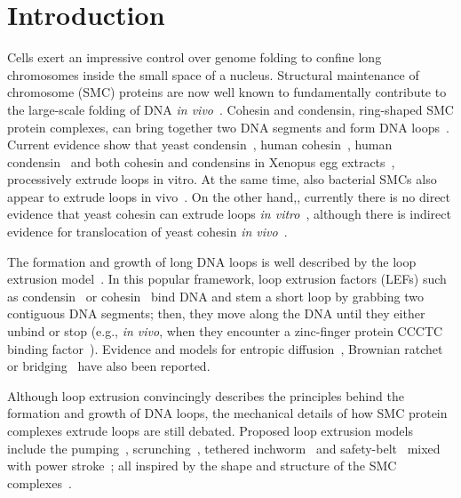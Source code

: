 \documentclass[aps,prl,twocolumn,a4paper,10pt,notitlepage,footinbib,nobalancelastpage,superscriptaddress,showpacs,floatfix]{revtex4-1}%
\begin{document}
\section{Introduction}

Cells exert an impressive control over genome folding to confine long chromosomes inside the small space of a nucleus. Structural maintenance of chromosome (SMC) proteins are now well known to fundamentally contribute to the large-scale folding of DNA \emph{in vivo}~\cite{Hirano2002}. Cohesin and condensin, ring-shaped SMC protein complexes, can bring together two DNA segments and form DNA loops~\cite{Nasmyth2011,Uhlmann2016,Hirano2016}. Current evidence show that yeast condensin~\cite{Ganji2018}, human cohesin~\cite{Davidson2019a,Kim2019a}, human condensin~\cite{Kong2020} and both cohesin and condensins in Xenopus egg extracts~\cite{Golfier2020}, processively extrude loops in vitro. 
At the same time, also bacterial SMCs also appear to extrude loops in vivo~\cite{Brandao2019a,Brandao2021,Anchimiuk2021}. On the other hand,, currently there is no direct evidence that yeast cohesin can extrude loops \emph{in vitro}~\cite{Stigler2016,Gutierrez-Escribano2019,Ryu2021}, although there is indirect evidence for translocation of yeast cohesin \emph{in vivo}~\cite{Glynn2004,Lengronne2004,Paldi2020}. 

The formation and growth of long DNA loops is well described by the loop extrusion model~\cite{Fudenberg2016,Goloborodko2016a,Sanborn2015a, Alipour2012, Nasmyth2011}. In this popular framework, loop extrusion factors (LEFs) such as condensin~\cite{Ganji2018} or cohesin~\cite{Davidson2019a,Kim2019a} bind DNA and stem a short loop by grabbing two contiguous DNA segments; then, they move along the DNA until they either unbind or stop (e.g., \emph{in vivo}, when they encounter a zinc-finger protein CCCTC binding factor~\cite{Phillips2009,Tang2015,Oti2016}). Evidence and models for entropic diffusion~\cite{Brackley2017prl, Davidson2016,Stigler2016,Yamamoto2017}, Brownian ratchet~\cite{Brackley2017prl,Higashi2021} or bridging~\cite{Ryu2020} have also been reported. 

Although loop extrusion convincingly describes the principles behind the formation and growth of DNA loops, the mechanical details of how SMC protein complexes extrude loops are still debated. Proposed loop extrusion models include the pumping~\cite{Marko2019,DieboldD2017}, scrunching~\cite{Terakawa2017,Takaki2020},  tethered inchworm~\cite{Nichols2018} and safety-belt~\cite{Kschonsak2017} mixed with power stroke~\cite{Nomidis2021}; all inspired by the shape and structure of the SMC complexes~\cite{RyuPre2019,DieboldD2017,Kamada2017}. 
\end{document}
